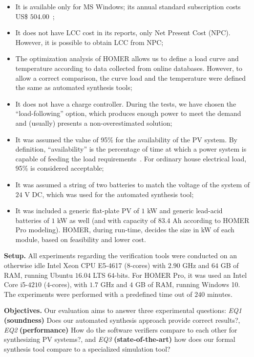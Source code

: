 \documentclass[runningheads]{llncs}
\begin{document}
\begin{itemize}
\item It is available only for MS Windows; its annual standard subscription costs US\$ $504.00$~\cite{HOMER}; 
\item It does not have LCC cost in its reports, only Net Present Cost (NPC). However, it is possible to obtain LCC from NPC; 
\item The optimization analysis of HOMER allows us to define a load curve and temperature according to data collected from online databases. However, to allow a correct comparison, the curve load and the temperature were defined the same as automated synthesis tools; 
\item It does not have a charge controller. During the tests, we have chosen the ``load-following'' option, which produces enough power to meet the demand~\cite{HOMER} and (usually) presents a non-overestimated solution; 
\item It was assumed the value of 95\% for the availability of the PV system. By definition, ``availability'' is the percentage of time at which a power system is capable of feeding the load requirements~\cite{Khatib2014}. For ordinary house electrical load, 95\% is considered acceptable;
\item It was assumed a string of two batteries to match the voltage of the system of $24$ V DC, which was used for the automated synthesis tool; 
\item It was included a generic flat-plate PV of $1$ kW and generic lead-acid batteries of $1$ kW as well (and with capacity of $83.4$ Ah according to HOMER Pro modeling). HOMER, during run-time, decides the size in kW of each module, based on feasibility and lower cost.
\end{itemize}

\noindent \textbf{Setup.} All experiments regarding the verification tools were conducted on an otherwise idle Intel Xeon CPU E5-4617 ($8$-cores) with $2.90$ GHz and $64$ GB of RAM, running Ubuntu $16.04$ LTS $64$-bits. For HOMER Pro, it was used an Intel Core i5-$4210$ ($4$-cores), with $1.7$ GHz and $4$ GB of RAM, running Windows 10. The experiments were performed with a predefined time out of $240$ minutes.

\noindent \textbf{Objectives.} Our evaluation aims to answer three experimental questions: 
\textit{EQ1} \textbf{(soundness)} Does our automated synthesis approach provide correct results?, 
\textit{EQ2} \textbf{(performance)} How do the software verifiers compare to each other for synthesizing PV systems?, and 
\textit{EQ3} \textbf{(state-of-the-art)} how does our formal synthesis tool compare to a specialized simulation tool?
\end{document}
